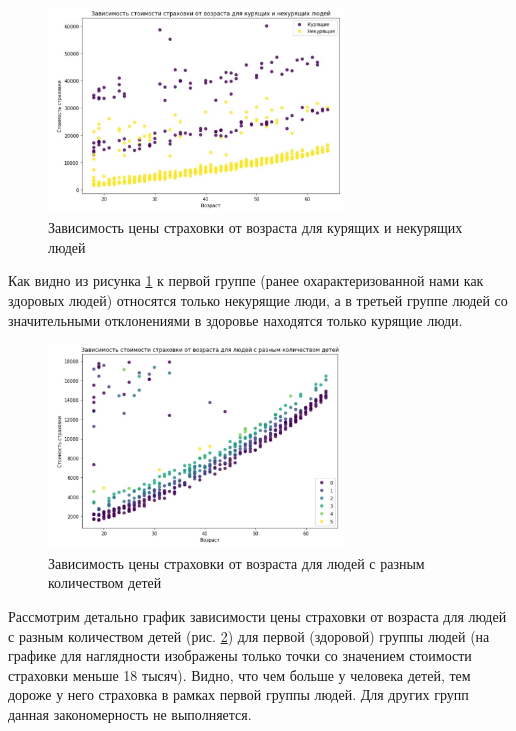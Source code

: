 \documentclass[a4paper,12pt]{article}
\begin{document}
\begin{figure}[H]
	\includegraphics[width=0.7\textwidth]{../[graphics]/age-charges-smoker.jpg}
	\centering
	\caption{Зависимость цены страховки от возраста для курящих и некурящих людей}
	\label{fig:age-charges-smoker}
\end{figure}

Как видно из рисунка \ref{fig:age-charges-smoker} к первой группе (ранее охарактеризованной нами как здоровых людей) относятся только некурящие люди, а в третьей группе людей со значительными отклонениями в здоровье находятся только курящие люди.

\begin{figure}[H]
	\includegraphics[width=0.7\textwidth]{../[graphics]/age-charges-childern.jpg}
	\centering
	\caption{Зависимость цены страховки от возраста для людей с разным количеством детей}
	\label{fig:age-charges-children}
\end{figure}

Рассмотрим детально график зависимости цены страховки от возраста для людей с разным количеством детей (рис. \ref{fig:age-charges-children}) для первой (здоровой) группы людей (на графике для наглядности изображены только точки со значением стоимости страховки меньше 18 тысяч). Видно, что чем больше у человека детей, тем дороже у него страховка в рамках первой группы людей. Для других групп данная закономерность не выполняется.
\end{document}

